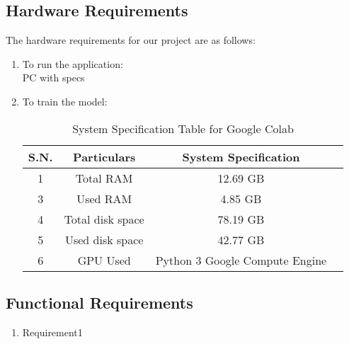             \subsection{Hardware Requirements}
               The hardware requirements for our project are as follows:
               \begin{enumerate}[label=(\alph*)]
                  \setlength\itemsep{1.5pt}
                  \item To run the application: \\ PC with specs
                  \item To train the model:
                  \begin{table}[ht]                            
                            \centering
                            \caption{System Specification Table for Google Colab }
                                \begin{tabular}{|c|c|c|c|}
                                  \hline
                                      \textbf{S.N.} &\textbf{Particulars}&\textbf{System Specification} \\
                                      \hline
                                      {1}&{Total RAM}&{12.69 GB }\\
                                     
                                      \hline
                                      {3}&{Used RAM}&{4.85 GB}\\
                                      \hline
                                    
                                      {4}&{Total disk space}&{78.19 GB}\\
                                      \hline
                                      {5}&{Used disk space}&{42.77 GB}\\
                                  \hline
                                      {6}&{GPU Used}&{Python 3 Google Compute Engine}\\
                                  \hline
                                \end{tabular}
                            \end{table}
                 \end{enumerate}
                 
        \subsection{Functional Requirements}
        \begin{enumerate}[label=(\alph*)]
                  \setlength\itemsep{1.5pt}
                \item Requirement1
        \end{enumerate}
          
